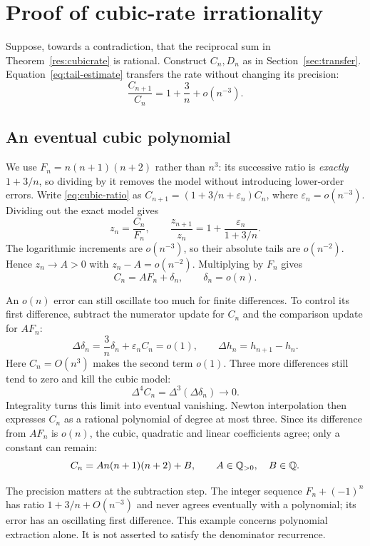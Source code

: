 \documentclass[11pt]{article}
\begin{document}
\section{Proof of cubic-rate irrationality}\label{sec:secondaryrate}
Suppose, towards a contradiction, that the reciprocal sum in
Theorem~\ref{res:cubicrate} is rational. Construct $C_n,D_n$ as in
Section~\ref{sec:transfer}. Equation~\eqref{eq:tail-estimate} transfers
the rate without changing its precision:
\begin{equation}\label{eq:cubic-ratio}
 \frac{C_{n+1}}{C_n}=1+\frac3n+o(n^{-3}).
\end{equation}
\subsection{An eventual cubic polynomial}\label{sec:cubic-extraction}
We use $F_n=n(n+1)(n+2)$ rather than $n^3$: its successive ratio is
\emph{exactly} $1+3/n$, so dividing by it removes the model without
introducing lower-order errors. Write
\eqref{eq:cubic-ratio} as $C_{n+1}=(1+3/n+\varepsilon_n)C_n$,
where $\varepsilon_n=o(n^{-3})$. Dividing out the exact model gives
\[
 z_n=\frac{C_n}{F_n},\qquad
 \frac{z_{n+1}}{z_n}=1+\frac{\varepsilon_n}{1+3/n}.
\]
The logarithmic increments are $o(n^{-3})$, so their absolute tails
are $o(n^{-2})$. Hence $z_n\to A>0$ with $z_n-A=o(n^{-2})$.
Multiplying by $F_n$ gives
\[
 C_n=AF_n+\delta_n,\qquad \delta_n=o(n).
\]

An $o(n)$ error can still oscillate too much for finite differences.
To control its first difference, subtract the numerator update for $C_n$
and the comparison update for $AF_n$:
\[
 \Delta\delta_n=\frac3n\delta_n+\varepsilon_n C_n=o(1),
 \qquad \Delta h_n=h_{n+1}-h_n.
\]
Here $C_n=O(n^3)$ makes the second term $o(1)$. Three more differences
still tend to zero and kill the cubic model:
\[
 \Delta^4 C_n=\Delta^3(\Delta\delta_n)\longrightarrow0.
\]
Integrality turns this limit into eventual vanishing. Newton
interpolation then expresses $C_n$ as a rational polynomial of degree
at most three. Since its difference from $AF_n$ is $o(n)$, the cubic,
quadratic and linear coefficients agree; only a constant can remain:
\begin{equation}\label{eq:cubic-shape}
 C_n=A n(n+1)(n+2)+B,\qquad A\in\Q_{>0},\quad B\in\Q.
\end{equation}

The precision matters at the subtraction step. The integer sequence
$F_n+(-1)^n$ has ratio $1+3/n+O(n^{-3})$ and never agrees eventually
with a polynomial; its error has an oscillating first difference.
This example concerns polynomial extraction alone. It is not asserted
to satisfy the denominator recurrence.
\end{document}

